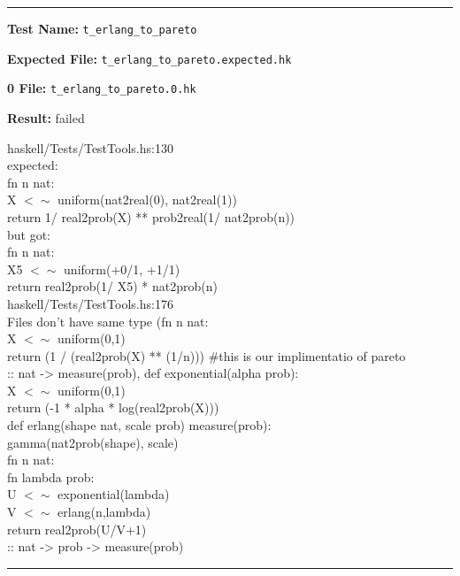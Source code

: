 \documentclass[11pt]{article}
\begin{document}
\hrule

\bigskip
\textbf{Test Name:} {\tt t\_erlang\_to\_pareto}

\textbf{Expected File:} {\tt t\_erlang\_to\_pareto.expected.hk}

\bigskip


\bigskip
\textbf{0 File:} {\tt t\_erlang\_to\_pareto.0.hk}

\bigskip


\bigskip
\textbf{Result:} failed

\bigskip
\noindent
haskell/Tests/TestTools.hs:130\\expected:\\fn n nat:\\X $<\sim$ uniform(nat2real(0), nat2real(1))\\return 1/ real2prob(X) ** prob2real(1/ nat2prob(n))\\but got:\\fn n nat:\\X5 $<\sim$ uniform(+0/1, +1/1)\\return real2prob(1/ X5) * nat2prob(n)\\

\bigskip
\noindent
haskell/Tests/TestTools.hs:176\\Files don't have same type (fn n nat:\\ X $<\sim$ uniform(0,1)\\    return (1 / (real2prob(X) ** (1/n))) \#this is our implimentatio of pareto\\ :: nat -> measure(prob), def exponential(alpha prob):\\    X $<\sim$ uniform(0,1)\\    return (-1 * alpha * log(real2prob(X)))\\def erlang(shape nat, scale prob) measure(prob):\\ gamma(nat2prob(shape), scale)\\fn n nat:\\  fn lambda prob:\\       U $<\sim$ exponential(lambda)\\     V $<\sim$ erlang(n,lambda)\\        return real2prob(U/V+1)\\ :: nat -> prob -> measure(prob)\\

\hrule
\end{document}
